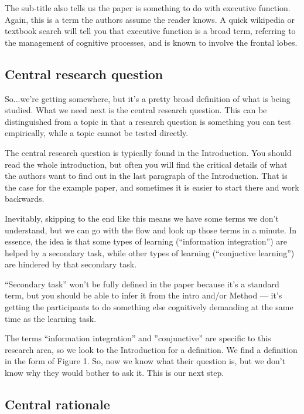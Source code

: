 \documentclass[12pt]{article}
\begin{document}
The sub-title also tells us the paper is something to do with
executive function. Again, this is a term the authors assume the
reader knows. A quick wikipedia or textbook search will tell you that
executive function is a broad term, referring to the management of
cognitive processes, and is known to involve the frontal lobes.

\subsection{Central research question}

So...we're getting somewhere, but it's a pretty broad definition of
what is being studied. What we need next is the central research
question. This can be distinguished from a topic in that a research
question is something you can test empirically, while a topic cannot
be tested directly.

The central research question is typically found in the Introduction. You should read the whole introduction, but often you will find the critical details of what the authors want to find out in the last paragraph of the Introduction. That is the case for the example paper, and sometimes it is easier to start there and work backwards.

Inevitably, skipping to the end like this means we have some terms we don't understand, but we can go with the flow and look up those terms in a minute. In essence, the idea is that some types of learning (``information integration'') are helped by a secondary task, while other types of learning (``conjuctive learning'') are hindered by that secondary task.

``Secondary task'' won't be fully defined in the paper because it's a
standard term, but you should be able to infer it from the intro
and/or Method --- it's getting the participants to do something else
cognitively demanding at the same time as the learning task.

The terms ``information integration'' and ''conjunctive'' are specific
to this research area, so we look to the Introduction for a
definition. We find a definition in the form of Figure 1. So, now we
know what their question is, but we don't know why they would bother
to ask it. This is our next step.

\subsection{Central rationale}
\end{document}
